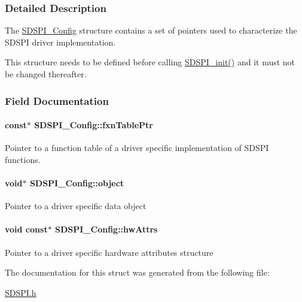 \subsubsection{Detailed Description}
The \hyperlink{struct_s_d_s_p_i___config}{S\-D\-S\-P\-I\-\_\-\-Config} structure contains a set of pointers used to characterize the S\-D\-S\-P\-I driver implementation. 

This structure needs to be defined before calling \hyperlink{_s_d_s_p_i_8h_a83cfcebe7875d9d8b5e08e57e6785ae6}{S\-D\-S\-P\-I\-\_\-init()} and it must not be changed thereafter. 

\subsubsection{Field Documentation}
\paragraph[{fxn\-Table\-Ptr}]{ const$\ast$ S\-D\-S\-P\-I\-\_\-\-Config\-::fxn\-Table\-Ptr}\label{struct_s_d_s_p_i___config_a5e816ddb1d2229f1016b99cba4153be0}
Pointer to a function table of a driver specific implementation of S\-D\-S\-P\-I functions. 
\paragraph[{object}]{\setlength{\rightskip}{0pt plus 5cm}void$\ast$ S\-D\-S\-P\-I\-\_\-\-Config\-::object}\label{struct_s_d_s_p_i___config_a019c899a3fc8e190998de085e900e5b6}
Pointer to a driver specific data object 
\paragraph[{hw\-Attrs}]{\setlength{\rightskip}{0pt plus 5cm}void const$\ast$ S\-D\-S\-P\-I\-\_\-\-Config\-::hw\-Attrs}\label{struct_s_d_s_p_i___config_a65d8bf130f6e7f1fe0ae550bf52df01f}
Pointer to a driver specific hardware attributes structure 

The documentation for this struct was generated from the following file\-:\begin{DoxyCompactItemize}
\item 
\hyperlink{_s_d_s_p_i_8h}{S\-D\-S\-P\-I.\-h}\end{DoxyCompactItemize}
